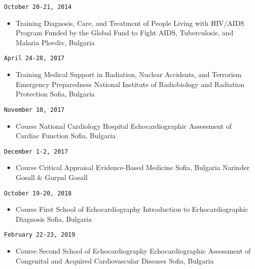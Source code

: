 \documentclass[
  12pt,
  letterpaper,
  DIV=11,
  numbers=noendperiod]{scrartcl}
\providecommand{\tightlist}{%
  \setlength{\itemsep}{0pt}\setlength{\parskip}{0pt}}\usepackage{longtable,booktabs,array}
\begin{document}
\texttt{October\ 20-21,\ 2014}

\begin{itemize}
\tightlist
\item
  Training \textbar{} Diagnosis, Care, and Treatment of People Living
  with HIV/AIDS \textbar{} Program Funded by the Global Fund to Fight
  AIDS, Tuberculosis, and Malaria \textbar{} Plovdiv, Bulgaria
\end{itemize}

\texttt{April\ 24-28,\ 2017}

\begin{itemize}
\tightlist
\item
  Training \textbar{} Medical Support in Radiation, Nuclear Accidents,
  and Terrorism Emergency Preparedness \textbar{} National Institute of
  Radiobiology and Radiation Protection \textbar{} Sofia, Bulgaria
\end{itemize}

\texttt{November\ 10,\ 2017}

\begin{itemize}
\tightlist
\item
  Course \textbar{} National Cardiology Hospital \textbar{}
  Echocardiographic Assessment of Cardiac Function \textbar{} Sofia,
  Bulgaria
\end{itemize}

\texttt{December\ 1-2,\ 2017}

\begin{itemize}
\tightlist
\item
  Course \textbar{} Critical Appraisal \textbar{} Evidence-Based
  Medicine \textbar{} Sofia, Bulgaria \textbar{} Narinder Gosall \&
  Gurpal Gosall
\end{itemize}

\texttt{October\ 19-20,\ 2018}

\begin{itemize}
\tightlist
\item
  Course \textbar{} First School of Echocardiography \textbar{}
  Introduction to Echocardiographic Diagnosis \textbar{} Sofia, Bulgaria
\end{itemize}

\texttt{February\ 22-23,\ 2019}

\begin{itemize}
\tightlist
\item
  Course \textbar{} Second School of Echocardiography \textbar{}
  Echocardiographic Assessment of Congenital and Acquired Cardiovascular
  Diseases \textbar{} Sofia, Bulgaria
\end{itemize}
\end{document}
